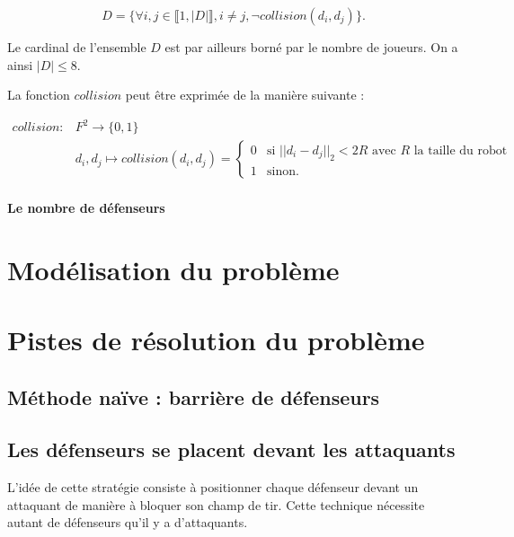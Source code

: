 \documentclass{article}
\begin{document}
\begin{equation*}
D = \{ \forall i, j \in \llbracket 1, |D| \rrbracket, i \ne j, \neg collision(d_i, d_j) \}.
\end{equation*}

Le cardinal de l'ensemble $D$ est par ailleurs borné par le nombre de joueurs. On a ainsi $|D| \leqslant 8$.

La fonction $collision$ peut être exprimée de la manière suivante :

\begin{align*}
  collision \colon &F^2 \to \{0, 1 \}\\
  &d_i, d_j \mapsto collision(d_i, d_j) = \begin{cases}
                                   0 & \text{si $|| d_i - d_j ||_2 < 2R$ avec $R$ la taille du robot} \\
                                   1 & \text{sinon.}
  \end{cases}
\end{align*}



\paragraph{Le nombre de défenseurs}


\section{Modélisation du problème}


\section{Pistes de résolution du problème}

\subsection{Méthode naïve : barrière de défenseurs}

\subsection{Les défenseurs se placent devant les attaquants}
L'idée de cette stratégie consiste à positionner chaque défenseur devant un attaquant de manière à bloquer son champ de tir. Cette technique nécessite autant de défenseurs qu'il y a d'attaquants. 
\end{document}
